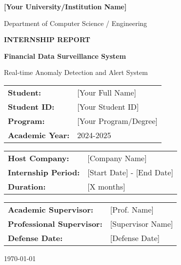 \begin{titlepage}
    \centering
    
    
    {\LARGE \textbf{[Your University/Institution Name]} \par}
    \vspace{0.5cm}
    {\large Department of Computer Science / Engineering \par}
    
    \vspace{2cm}
    
    {\Huge \textbf{INTERNSHIP REPORT} \par}
    \vspace{1cm}
    
    {\LARGE \textbf{Financial Data Surveillance System} \par}
    \vspace{0.5cm}
    {\large Real-time Anomaly Detection and Alert System \par}
    
    \vspace{2cm}
    
    \begin{tabular}{ll}
        \textbf{Student:} & [Your Full Name] \\[0.3cm]
        \textbf{Student ID:} & [Your Student ID] \\[0.3cm]
        \textbf{Program:} & [Your Program/Degree] \\[0.3cm]
        \textbf{Academic Year:} & 2024-2025 \\[0.3cm]
    \end{tabular}
    
    \vspace{1.5cm}
    
    \begin{tabular}{ll}
        \textbf{Host Company:} & [Company Name] \\[0.3cm]
        \textbf{Internship Period:} & [Start Date] - [End Date] \\[0.3cm]
        \textbf{Duration:} & [X months] \\[0.3cm]
    \end{tabular}
    
    \vspace{1.5cm}
    
    \begin{tabular}{ll}
        \textbf{Academic Supervisor:} & [Prof. Name] \\[0.3cm]
        \textbf{Professional Supervisor:} & [Supervisor Name] \\[0.3cm]
        \textbf{Defense Date:} & [Defense Date] \\[0.3cm]
    \end{tabular}
    
    \vfill
    
    {\large \today \par}
    
\end{titlepage}

\setcounter{page}{1}
